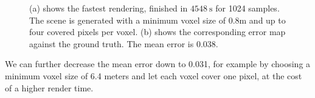 \begin{figure}[ht]
\begin{subfigure}[b]{\linewidth}
{        }
        \caption{}
    \end{subfigure}
    \begin{subfigure}[b]{\linewidth}
        \caption{}
    \end{subfigure}
    \caption[Rendering and \FLIP error map of the fastest combination]{(a) shows the fastest rendering, finished in $\SI{4548}{\s}$ for 1024 samples. The scene is generated with a minimum voxel size of 0.8m and up to four covered pixels per voxel. (b) shows the corresponding \FLIP error map against the ground truth. The mean \FLIP error is 0.038.}
    \label{fig:render_and_error_fastest}
\end{figure}
We can further decrease the mean \FLIP error down to 0.031, for example by choosing a minimum voxel size of 6.4 meters and let each voxel cover one pixel, at the cost of a higher render time.

